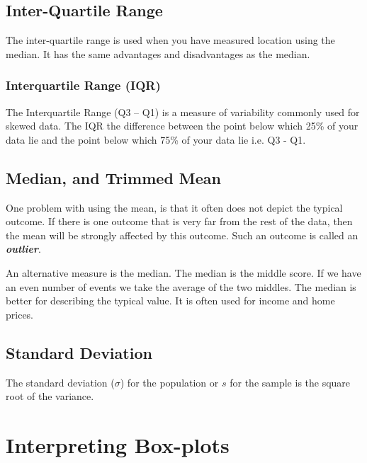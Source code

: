 ﻿\documentclass[]{report}
\begin{document}
\subsection{Inter-Quartile Range}
The inter-quartile range is used when you have measured location using the median. 
It has the same advantages and disadvantages as the median.

\subsubsection{Interquartile Range (IQR)}
The Interquartile Range (Q3 – Q1) is a  measure of variability commonly used for skewed data.
The IQR  the difference between the point below which 25\% of your data lie and the point below which 75\% of your data lie i.e. Q3  - Q1. 


\subsection{Median, and Trimmed Mean}

One problem with using the mean, is that it often does not depict the typical outcome.  If there is one outcome that is very far from the rest of the data, then the mean will be strongly affected by this outcome.  Such an outcome is called an \textbf{\textit{outlier}}.  

An alternative measure is the median.  The median is the middle score.  If we have an even number of events we take the average of the two middles.  The median is better for describing the typical value.  It is often used for income and home prices.


\subsection*{Standard Deviation}
The standard deviation ($\sigma$) for the population or $s$ for the sample is the square root of
the variance.



\section{Interpreting Box-plots}
\end{document}
